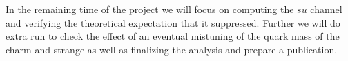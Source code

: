 \documentclass [a4paper, 11pt]{article}
\newcommand{\Pvec}{\mathbf{P}}
\begin{document}
In the remaining time of the project we will focus on computing the $su$ channel and verifying the
theoretical expectation that it suppressed. Further we will do extra run to check the effect of an
eventual mistuning of the quark mass of the charm and strange as well as finalizing the analysis and prepare a publication.







\end{document}
